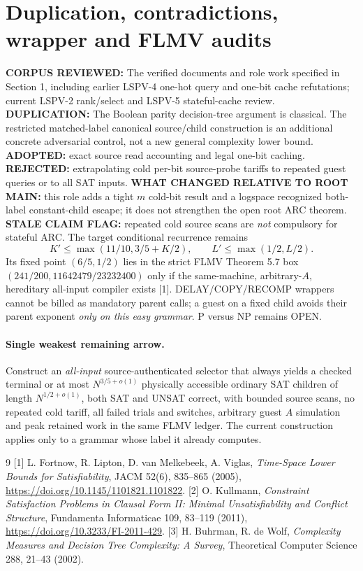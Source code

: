 \documentclass[11pt]{article}
\begin{document}
\section{Duplication, contradictions, wrapper and FLMV audits}
\textbf{CORPUS REVIEWED:} The verified documents and role work specified in Section 1, including earlier LSPV-4 one-hot query and one-bit cache refutations; current LSPV-2 rank/select and LSPV-5 stateful-cache review. \textbf{DUPLICATION:} The Boolean parity decision-tree argument is classical. The restricted matched-label canonical source/child construction is an additional concrete adversarial control, not a new general complexity lower bound. \textbf{ADOPTED:} exact source read accounting and legal one-bit caching. \textbf{REJECTED:} extrapolating cold per-bit source-probe tariffs to repeated guest queries or to all SAT inputs. \textbf{WHAT CHANGED RELATIVE TO ROOT MAIN:} this role adds a tight $m$ cold-bit result and a logspace recognized both-label constant-child escape; it does not strengthen the open root ARC theorem. \textbf{STALE CLAIM FLAG:} repeated cold source scans are \emph{not} compulsory for stateful ARC.
The target conditional recurrence remains
\[
K'\le\max(11/10,3/5+K/2),\qquad
L'\le\max(1/2,L/2).
\]
Its fixed point $(6/5,1/2)$ lies in the strict FLMV Theorem 5.7 box $(241/200,11642479/23232400)$ only if the same-machine, arbitrary-$A$, hereditary all-input compiler exists [1]. DELAY/COPY/RECOMP wrappers cannot be billed as mandatory parent calls; a guest on a fixed child avoids their parent exponent \emph{only on this easy grammar}. P versus NP remains OPEN.
\paragraph{Single weakest remaining arrow.}
Construct an \emph{all-input} source-authenticated selector that always yields a checked terminal or at most $N^{3/5+o(1)}$ physically accessible ordinary SAT children of length $N^{1/2+o(1)}$, both SAT and UNSAT correct, with bounded source scans, no repeated cold tariff, all failed trials and switches, arbitrary guest $A$ simulation and peak retained work in the same FLMV ledger. The current construction applies only to a grammar whose label it already computes.
\begin{thebibliography}{9}
 [1] L. Fortnow, R. Lipton, D. van Melkebeek, A. Viglas, \emph{Time-Space Lower Bounds for Satisfiability}, JACM 52(6), 835--865 (2005), \url{https://doi.org/10.1145/1101821.1101822}.
 [2] O. Kullmann, \emph{Constraint Satisfaction Problems in Clausal Form II: Minimal Unsatisfiability and Conflict Structure}, Fundamenta Informaticae 109, 83--119 (2011), \url{https://doi.org/10.3233/FI-2011-429}.
 [3] H. Buhrman, R. de Wolf, \emph{Complexity Measures and Decision Tree Complexity: A Survey}, Theoretical Computer Science 288, 21--43 (2002).
\end{thebibliography}
\end{document}
